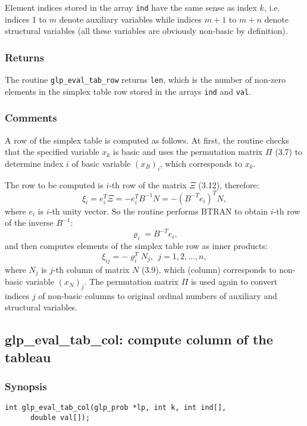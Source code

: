 Element indices stored in the array \verb|ind| have the same sense as
index $k$, i.e. indices 1 to $m$ denote auxiliary variables while
indices $m+1$ to $m+n$ denote structural variables (all these variables
are obviously non-basic by definition).

\subsubsection*{Returns}

The routine \verb|glp_eval_tab_row| returns \verb|len|, which is the
number of non-zero elements in the simplex table row stored in the
arrays \verb|ind| and \verb|val|.

\subsubsection*{Comments}

A row of the simplex table is computed as follows. At first, the
routine checks that the specified variable $x_k$ is basic and uses the
permutation matrix $\Pi$ (3.7) to determine index $i$ of basic variable
$(x_B)_i$, which corresponds to $x_k$.

The row to be computed is $i$-th row of the matrix $\Xi$ (3.12),
therefore:
$$\xi_i=e_i^T\Xi=-e_i^TB^{-1}N=-(B^{-T}e_i)^TN,$$
where $e_i$ is $i$-th unity vector. So the routine performs BTRAN to
obtain $i$-th row of the inverse $B^{-1}$:
$$\varrho_i=B^{-T}e_i,$$
and then computes elements of the simplex table row as inner products:
$$\xi_{ij}=-\varrho_i^TN_j,\ \ j=1,2,\dots,n,$$
where $N_j$ is $j$-th column of matrix $N$ (3.9), which (column)
corresponds to non-basic variable $(x_N)_j$. The permutation matrix
$\Pi$ is used again to convert indices $j$ of non-basic columns to
original ordinal numbers of auxiliary and structural variables.

\subsection{glp\_eval\_tab\_col: compute column of the tableau}

\subsubsection*{Synopsis}

\begin{verbatim}
int glp_eval_tab_col(glp_prob *lp, int k, int ind[],
      double val[]);
\end{verbatim}


